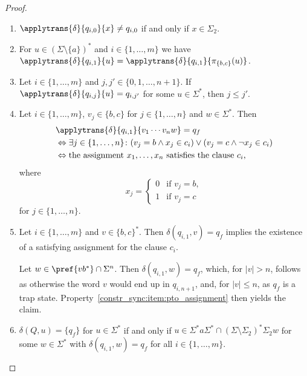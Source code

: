 \begin{proof}
\begin{enumerate}
\item \label{constr_sync:item:pto_qi0}
$\applytrans{\delta}{q_{i,0}}{x} \ne q_{i,0}$ if and only if $x \in \Sigma_2$.

\item \label{constrsync:item:pto:proj} For $u \in (\Sigma \setminus \{a\})^*$ 
and $i \in \{1,\ldots,m\}$ 
we have $\applytrans{\delta}{q_{i,1}}{u} = \applytrans{\delta}{q_{i,1}}{\pi_{\{b,c\}}(u)}$.

\item \label{constrsync:subclasses:pto:item:monotone} Let $i \in \{1,\ldots,m\}$ and $j,j' \in \{0,1,\ldots,n+1\}$.
If $\applytrans{\delta}{q_{i,j}}{u} = q_{i,j'}$ for some $u \in \Sigma^*$,
then $j \le j'$.

\item \label{constr_sync:item:pto_assignment} 
Let $i \in \{1,\ldots,m\}$, $v_j \in \{b,c\}$ for $j \in \{1,\ldots,n\}$ and $w \in \Sigma^*$.
Then
\begin{align*}
	& \applytrans{\delta}{q_{i,1}}{v_1 \cdots v_n w} = q_f \\
	& \Leftrightarrow 
	\exists j \in \{1,\ldots,n\} \colon (v_j = b \land x_j \in c_i) \lor ( v_j = c \land \neg x_j \in c_i) \\
	& \Leftrightarrow  \text{the assignment } x_1, \ldots, x_n \text{ satisfies the clause $c_i$, }
\end{align*}
where
\begin{equation}\label{constrsync:input:pto:eqn:assignment}
	x_j = \begin{cases}
		0 & \text{if } v_j = b, \\
		1 & \text{if } v_j = c
	\end{cases}
\end{equation}
for $j \in \{1,\ldots,n\}$.

\item \label{constr_sync:item:pto_assignment2} Let $i \in \{1,\ldots,m\}$ and $v \in \{b,c\}^*$.
Then $\delta(q_{i,1}, v) = q_f$
implies the existence of a satisfying assignment for the clause $c_i$.

Let $w \in \pref{vb^*} \cap \Sigma^n$.
Then $\delta(q_{i,1}, w) = q_f$,
which, for $|v| > n$, follows
as otherwise the word $v$ would end up in $q_{i,n+1}$,
and, for $|v| \le n$, as $q_f$ is a trap state.
Property~\ref{constr_sync:item:pto_assignment} 
then yields the claim.

\item \label{constrsync:subclasses:pto:syncword} $\delta(Q, u) = \{q_f\}$ for $u \in \Sigma^*$ if and only if $u \in \Sigma^* a \Sigma^* \cap (\Sigma \setminus \Sigma_2)^*\Sigma_2 w$
 for some $w \in \Sigma^*$
 with  $\delta(q_{i,1}, w) = q_f$ for all $i \in \{1,\ldots,m\}$.
  

\end{enumerate}
\end{proof}
